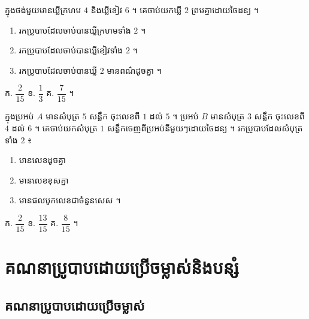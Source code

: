 \begin{pro}
ក្នុងថង់មួយមានឃ្លីក្រហម $4$ និងឃ្លីខៀវ $6$ ។ គេចាប់យកឃ្លី $2$ ព្រមគ្នាដោយចៃដន្យ ។
\begin{enumerate}[a]
  \item រកប្រូបាបដែលចាប់បានឃ្លីក្រហមទាំង $2$ ។
  \item រកប្រូបាបដែលចាប់បានឃ្លីខៀវទាំង $2$ ។
  \item រកប្រូបាបដែលចាប់បានឃ្លី $2$ មានពណ៌ដូចគ្នា ។
\end{enumerate}
\ans
ក. $\dfrac{2}{15}$ \quad ខ. $\dfrac{1}{3}$ \quad គ. $\dfrac{7}{15}$ ។
\end{pro}

\begin{pro}
ក្នុងប្រអប់ $A$ មានសំបុត្រ $5$ សន្លឹក ចុះលេខពី $1$ ដល់ $5$ ។ ប្រអប់ $B$ មានសំបុត្រ $3$ សន្លឹក ចុះលេខពី $4$ ដល់ $6$ ។ គេចាប់យកសំបុត្រ $1$ សន្លឹកចេញពីប្រអប់នីមួយៗដោយចៃដន្យ ។ រកប្រូបាបដែលសំបុត្រទាំង $2$ ៖
\begin{enumerate}[a]
  \item មានលេខដូចគ្នា
  \item មានលេខខុសគ្នា
  \item មានផលបូកលេខជាចំនួនសេស ។
\end{enumerate}
\ans
ក. $\dfrac{2}{15}$ \quad ខ. $\dfrac{13}{15}$ \quad គ. $\dfrac{8}{15}$ ។
\end{pro}

\section{គណនាប្រូបាបដោយប្រើចម្លាស់និងបន្សំ}
\subsection{គណនាប្រូបាបដោយប្រើចម្លាស់}

